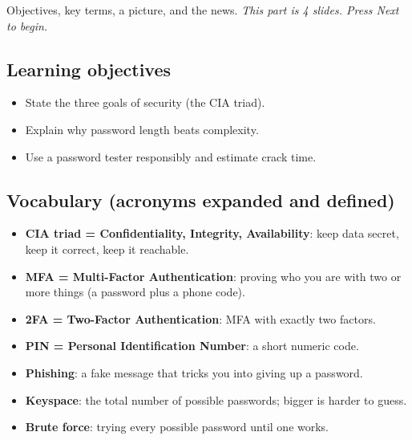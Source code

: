 \documentclass[12pt,openany]{book}
\begin{document}
Objectives, key terms, a picture, and the news.
{\small\itshape\color{gray}This part is 4 slides. Press Next to begin.}

\medskip

\subsection*{Learning objectives}


\begin{itemize}

  \item State the three goals of security (the CIA triad).

  \item Explain why password length beats complexity.

  \item Use a password tester responsibly and estimate crack time.

\end{itemize}

\medskip

\subsection*{Vocabulary (acronyms expanded and defined)}


\begin{itemize}

  \item \textbf{CIA triad = Confidentiality, Integrity, Availability}: keep data secret, keep it correct, keep it reachable.

  \item \textbf{MFA = Multi-Factor Authentication}: proving who you are with two or more things (a password plus a phone code).

  \item \textbf{2FA = Two-Factor Authentication}: MFA with exactly two factors.

  \item \textbf{PIN = Personal Identification Number}: a short numeric code.

  \item \textbf{Phishing}: a fake message that tricks you into giving up a password.

  \item \textbf{Keyspace}: the total number of possible passwords; bigger is harder to guess.

  \item \textbf{Brute force}: trying every possible password until one works.

\end{itemize}
\end{document}
